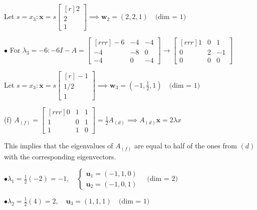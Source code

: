 \documentclass{article}
\newcommand\ddfrac[2]{\frac{\displaystyle #1}{\displaystyle #2}}
\begin{document}
\begin{minipage}[t]{0.48\linewidth}
        Let $s = x_3: \textbf{x} = s \begin{bmatrix}[r]
            2 \\
            2 \\
            1 
        \end{bmatrix} \implies \textbf{w} _2 = (2, 2, 1) \quad \text{(dim = 1)}$
        
        $\bullet$ For $ \lambda _3 = -6: -6I - A = \begin{bmatrix}[rrr]
            -6 & -4 & -4 \\
            -4 & -8 & 0 \\
            -4 & 0 & -4 
        \end{bmatrix} \to \begin{bmatrix}[rrr]
            1 & 0 & 1 \\
            0 & 2 & -1 \\
            0 & 0 & 0 
        \end{bmatrix} $

        Let $s = x_3: \textbf{x} = s \begin{bmatrix}[r]
            -1 \\
            1/2 \\
            1 
        \end{bmatrix} \implies \textbf{w} _3 = (-1, \ddfrac{1}{2} , 1) \quad \text{(dim = 1)}$



    \end{minipage} \hfill 
    \begin{minipage}[t]{0.48\linewidth}
        (f) $A_{(f)} = \begin{bmatrix}[rrr]
            0 & 1 & 1 \\
            1 & 0 & 1 \\
            1 & 1 & 0 
        \end{bmatrix} = \ddfrac{1}{2} A_{(d)}  \implies  A_{(d)} \textbf{x} =2 \lambda  x$

        This implies that the eigenvalues of $A_{(f)}$ are equal to half of the ones from $(d)$ with
        the corresponding eigenvectors.

        $\bullet \lambda _1 = \frac{1}{2} (-2) = -1, \quad \begin{cases}{}
            \textbf{u}_1 = (-1,1,0) \\
            \textbf{u}_2 = (-1, 0, 1)
        \end{cases} \quad \text{(dim = 2)}$

        $\bullet \lambda _2 = \frac{1}{2}(4) = 2,\quad \textbf{u}_3 = (1,1,1) \quad \text{(dim = 1)}$

    \end{minipage}
\end{document}
